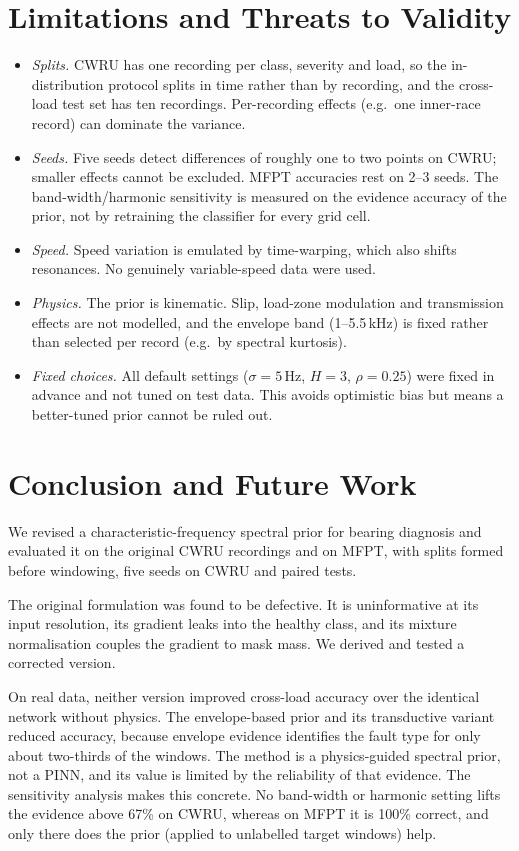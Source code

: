 \documentclass[conference]{IEEEtran}
\begin{document}
\section{Limitations and Threats to Validity}
\begin{itemize}
\item \emph{Splits.} CWRU has one recording per class, severity and load, so
the in-distribution protocol splits in time rather than by recording, and the
cross-load test set has ten recordings. Per-recording effects (e.g.\ one
inner-race record) can dominate the variance.
\item \emph{Seeds.} Five seeds detect differences of roughly one to two points
on CWRU; smaller effects cannot be excluded. MFPT accuracies rest on 2--3
seeds. The band-width/harmonic sensitivity is measured on the evidence accuracy
of the prior, not by retraining the classifier for every grid cell.
\item \emph{Speed.} Speed variation is emulated by time-warping, which also
shifts resonances. No genuinely variable-speed data were used.
\item \emph{Physics.} The prior is kinematic. Slip, load-zone modulation and
transmission effects are not modelled, and the envelope band (1--5.5\,kHz) is
fixed rather than selected per record (e.g.\ by spectral kurtosis).
\item \emph{Fixed choices.} All default settings ($\sigma=5$\,Hz, $H=3$,
$\rho=0.25$) were fixed in advance and not tuned on test data. This avoids
optimistic bias but means a better-tuned prior cannot be ruled out.
\end{itemize}

\section{Conclusion and Future Work}
We revised a characteristic-frequency spectral prior for bearing diagnosis and
evaluated it on the original CWRU recordings and on MFPT, with splits formed
before windowing, five seeds on CWRU and paired tests.

The original formulation was found to be defective. It is uninformative at its
input resolution, its gradient leaks into the healthy class, and its mixture
normalisation couples the gradient to mask mass. We derived and tested a
corrected version.

On real data, neither version improved cross-load accuracy over the identical
network without physics. The envelope-based prior and its transductive variant
reduced accuracy, because envelope evidence identifies the fault type for only
about two-thirds of the windows. The method is a physics-guided spectral prior,
not a PINN, and its value is limited by the reliability of that evidence.
The sensitivity analysis makes this concrete. No band-width or harmonic
setting lifts the evidence above 67\% on CWRU, whereas on MFPT it is 100\%
correct, and only there does the prior (applied to unlabelled target windows)
help.
\end{document}
